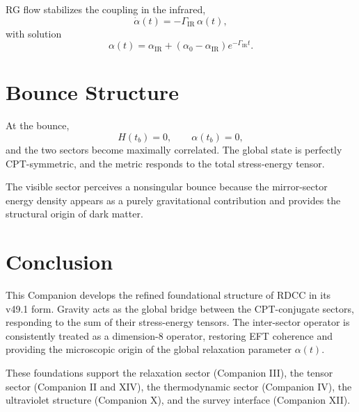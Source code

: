 \documentclass[11pt,a4paper]{article}
\begin{document}
RG flow stabilizes the coupling in the infrared,
\begin{equation}
\dot{\alpha}(t) = -\Gamma_{\mathrm{IR}}\,\alpha(t),
\end{equation}
with solution
\begin{equation}
\alpha(t)
=
\alpha_{\mathrm{IR}}
+
\left(\alpha_{0}-\alpha_{\mathrm{IR}}\right)
e^{-\Gamma_{\mathrm{IR}} t}.
\end{equation}
\section{Bounce Structure}

At the bounce,
\begin{equation}
H(t_{b}) = 0,
\qquad
\alpha(t_{b}) = 0,
\end{equation}
and the two sectors become maximally correlated. The global state is perfectly
CPT-symmetric, and the metric responds to the total stress-energy tensor.

The visible sector perceives a nonsingular bounce because the mirror-sector
energy density appears as a purely gravitational contribution and provides the
structural origin of dark matter.

\section{Conclusion}

This Companion develops the refined foundational structure of RDCC in its
v49.1 form. Gravity acts as the global bridge between the CPT-conjugate
sectors, responding to the sum of their stress-energy tensors. The inter-sector
operator is consistently treated as a dimension-8 operator, restoring EFT
coherence and providing the microscopic origin of the global relaxation
parameter $\alpha(t)$.

These foundations support the relaxation sector (Companion III), the tensor
sector (Companion II and XIV), the thermodynamic sector (Companion IV), the
ultraviolet structure (Companion X), and the survey interface (Companion XII).
\end{document}
